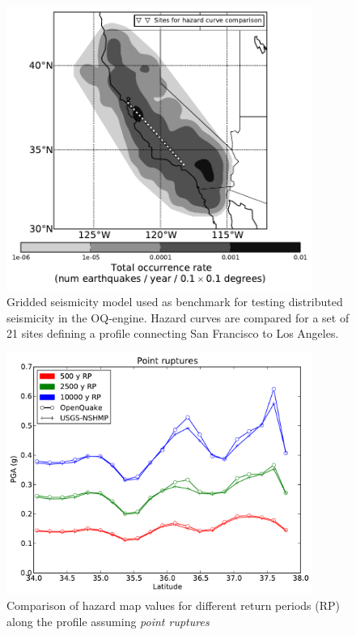 \begin{figure}
\centering
\includegraphics[width=10cm]{./qareport/pictures/CAmapC_21.pdf}
\caption{Gridded seismicity model used as benchmark for testing distributed seismicity in the OQ-engine. Hazard curves are compared for a set of 21 sites defining a profile connecting San Francisco to Los Angeles.}
\label{fig:cal_grid}
\end{figure}


\begin{figure}
\centering
\includegraphics[width=10cm]{./qareport/pictures/gridded_seismicity_oq_nshmp_point.pdf}
\caption{Comparison of hazard map values for different return periods (RP) along the profile assuming \textit{point ruptures}}
\label{fig:cal_grid_map_point}
\end{figure}

